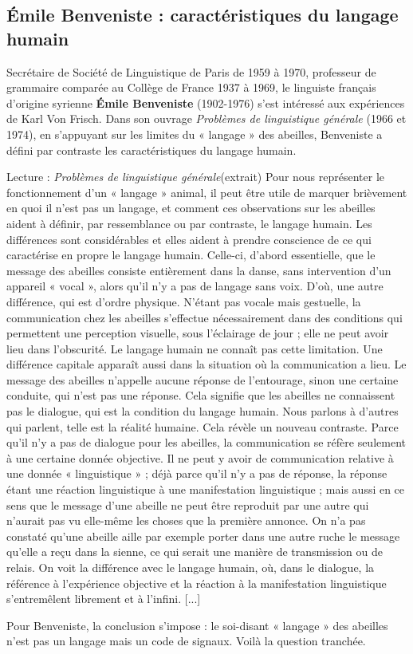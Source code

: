 \subsection{Émile Benveniste : caractéristiques du langage humain}
Secrétaire de Société de Linguistique de Paris de 1959 à 1970, professeur de grammaire comparée au Collège de France 1937 à 1969, le linguiste français d’origine syrienne \textbf{Émile Benveniste} (1902-1976) s’est intéressé aux expériences de Karl Von Frisch. Dans son ouvrage \textit{Problèmes de linguistique générale} (1966 et 1974), en s’appuyant sur les limites du « langage » des abeilles, Benveniste a défini par contraste les caractéristiques du langage humain.
\begin{lecture}{Lecture : \textit{Problèmes de linguistique générale}(extrait)}
Pour nous représenter le fonctionnement d’un « langage » animal, il peut être utile de marquer brièvement en quoi il n’est pas un langage, et comment ces observations sur les abeilles aident à définir, par ressemblance ou par contraste, le langage humain. Les différences sont considérables et elles aident à prendre conscience de ce qui caractérise en propre le langage humain. Celle-ci, d’abord essentielle, que le message des abeilles consiste entièrement dans la danse, sans intervention d’un appareil « vocal », alors qu’il n’y a pas de langage sans voix. D’où, une autre différence, qui est d’ordre physique. N’étant pas vocale mais gestuelle, la communication chez les abeilles s’effectue nécessairement dans des conditions qui permettent une perception visuelle, sous l’éclairage de jour ; elle ne peut avoir lieu dans l’obscurité. Le langage humain ne connaît pas cette limitation. Une différence capitale apparaît aussi dans la situation où la communication a lieu. Le message des abeilles n’appelle aucune réponse de l’entourage, sinon une certaine conduite, qui n’est pas une réponse. Cela signifie que les abeilles ne connaissent pas le dialogue, qui est la condition du langage humain. Nous parlons à d’autres qui parlent, telle est la réalité humaine. Cela révèle un nouveau contraste. Parce qu’il n’y a pas de dialogue pour les abeilles, la communication se réfère seulement à une certaine donnée objective. Il ne peut y avoir de communication relative à une donnée « linguistique » ; déjà parce qu’il n’y a pas de réponse, la réponse étant une réaction linguistique à une manifestation linguistique ; mais aussi en ce sens que le message d’une abeille ne peut être reproduit par une autre qui n’aurait pas vu elle-même les choses que la première annonce. On n’a pas constaté qu’une abeille aille par exemple porter dans une autre ruche le message qu’elle a reçu dans la sienne, ce qui serait une manière de transmission ou de relais. On voit la différence avec le langage humain, où, dans le dialogue, la référence à l’expérience objective et la réaction à la manifestation linguistique s’entremêlent librement et à l’infini. [...]
\end{lecture}
Pour Benveniste, la conclusion s’impose : le soi-disant « langage » des abeilles n’est pas un langage mais un code de signaux. Voilà la question tranchée.
